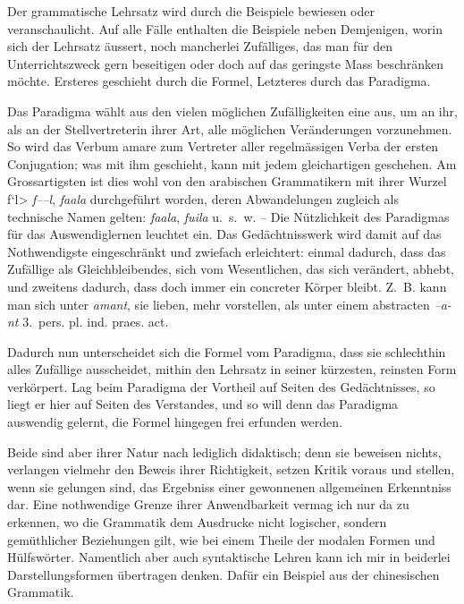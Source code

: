 Der grammatische Lehrsatz wird durch die Beispiele bewiesen oder veranschaulicht. Auf alle Fälle enthalten die Beispiele neben Demjenigen, worin sich \label{sp.117} der Lehrsatz äussert, noch mancherlei Zufälliges, das man für den Unterrichtszweck gern beseitigen oder doch auf das geringste Mass beschränken möchte. Ersteres geschieht durch die Formel, Letzteres durch das Paradigma.

Das Paradigma wählt aus den vielen möglichen Zufälligkeiten eine aus, um an ihr, als an der Stellvertreterin ihrer Art, alle möglichen Veränderungen vorzunehmen. So wird das Verbum amare zum Vertreter aller regelmässigen Verba der ersten Conjugation; was mit ihm geschieht, kann mit jedem gleichartigen geschehen. Am Grossartigsten ist dies wohl von den arabischen Grammatikern mit ihrer Wurzel \<\setarab \novocalize f`l>  \textit{f–{\ain}–l}, \textit{fa{\ain}ala} durchgeführt worden, deren Abwandelungen zugleich als technische Namen gelten:  \textit{fa{\ain}ala},   \textit{fu{\ain}ila} u.~s.~w. – Die Nützlichkeit des Paradigmas für das Auswendiglernen leuchtet ein. Das Gedächtnisswerk wird damit auf das Nothwendigste eingeschränkt und zwiefach erleichtert: einmal dadurch, dass das Zufällige als Gleichbleibendes, sich vom Wesentlichen, das sich verändert, abhebt, und zweitens dadurch, dass doch immer ein concreter Körper bleibt. Z.~B. kann man sich unter \textit{amant}, sie lieben, mehr vorstellen, als unter einem abstracten \textit{–a-nt} 3.~pers. pl. ind. praes. act.

Dadurch nun unterscheidet sich die Formel vom Paradigma, dass sie schlechthin alles Zufällige ausscheidet, mithin den Lehrsatz in seiner kürzesten, reinsten Form verkörpert. Lag beim Paradigma der Vortheil auf Seiten des Gedächtnisses, so liegt er hier auf Seiten des Verstandes, und so will denn das Paradigma auswendig gelernt, die Formel hingegen frei erfunden werden.

Beide sind aber ihrer Natur nach lediglich didaktisch; denn sie beweisen nichts, verlangen vielmehr den Beweis ihrer Richtigkeit, setzen \label{fp.124} Kritik voraus und stellen, wenn sie gelungen sind, das Ergebniss einer gewonnenen allgemeinen Erkenntniss dar. Eine nothwendige Grenze ihrer Anwendbarkeit vermag ich nur da zu erkennen, wo die Grammatik dem Ausdrucke nicht logischer, sondern gemüthlicher Beziehungen gilt, wie bei einem Theile der modalen Formen und Hülfswörter. Namentlich aber auch syntaktische Lehren kann ich mir in beiderlei Darstellungsformen übertragen denken. Dafür ein Beispiel aus der chinesischen Grammatik.\pagebreak

